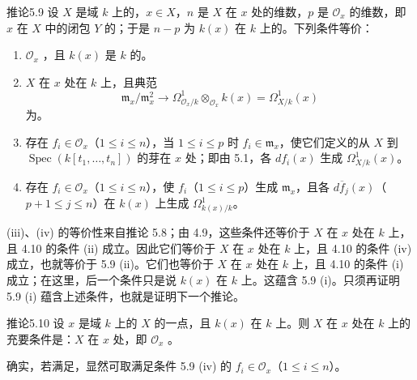 \begin{SGAresult}{推论}{5.9}
设 $X$ 是域 $k$ 上的，$x\in X$，$n$ 是 $X$ 在 $x$ 处的维数，$p$ 是 $\mathcal O_x$ 的维数，即 $x$ 在 $X$ 中的闭包 $Y$ 的；于是 $n-p$ 为 $k(x)$ 在 $k$ 上的。下列条件等价：
\begin{enumerate}
\item[(i)] $\mathcal O_x$ ，且 $k(x)$ 是 $k$ 的。
\item[(ii)] $X$ 在 $x$ 处在 $k$ 上，且典范
\[
\mathfrak m_x/\mathfrak m_x^2\longrightarrow
\Omega^1_{\mathcal O_x/k}\otimes_{\mathcal O_x}k(x)=\Omega^1_{X/k}(x)
\]
为。
\item[(iii)] 存在 $f_i\in\mathcal O_x$（$1\leq i\leq n$），当 $1\leq i\leq p$ 时 $f_i\in\mathfrak m_x$，使它们定义的从 $X$ 到 $\operatorname{Spec}(k[t_1,\ldots,t_n])$ 的芽在 $x$ 处；即由 5.1，各 $df_i(x)$ 生成 $\Omega^1_{X/k}(x)$。
\item[(iv)] 存在 $f_i\in\mathcal O_x$（$1\leq i\leq n$），使 $f_i$（$1\leq i\leq p$）生成 $\mathfrak m_x$，且各 $d\overline f_j(x)$（$p+1\leq j\leq n$）在 $k(x)$ 上生成 $\Omega^1_{k(x)/k}$。
\end{enumerate}
\end{SGAresult}
(iii)、(iv) 的等价性来自推论 5.8；由 4.9，这些条件还等价于 $X$ 在 $x$ 处在 $k$ 上，且 4.10 的条件 (ii) 成立。因此它们等价于 $X$ 在 $x$ 处在 $k$ 上，且 4.10 的条件 (iv) 成立，也就等价于 5.9 (ii)。它们也等价于 $X$ 在 $x$ 处在 $k$ 上，且 4.10 的条件 (i) 成立；在这里，后一个条件只是说 $k(x)$ 在 $k$ 上。这蕴含 5.9 (i)。只须再证明 5.9 (i) 蕴含上述条件，也就是证明下一个推论。

\begin{SGAresult}{推论}{5.10}
设 $x$ 是域 $k$ 上的 $X$ 的一点，且 $k(x)$ 在 $k$ 上。则 $X$ 在 $x$ 处在 $k$ 上的充要条件是：$X$ 在 $x$ 处，即 $\mathcal O_x$ 。
\end{SGAresult}
确实，若满足，显然可取满足条件 5.9 (iv) 的 $f_i\in\mathcal O_x$（$1\leq i\leq n$）。

